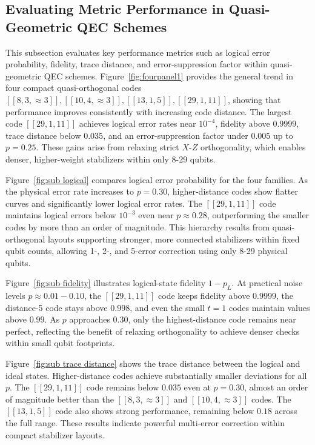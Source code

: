 \documentclass{iopjournal}
\theoremstyle{thmstyleone}%
\theoremstyle{thmstyletwo}%
\theoremstyle{thmstylethree}%
\begin{document}
\subsection{Evaluating Metric Performance in Quasi-Geometric QEC Schemes}


This subsection evaluates key performance metrics such as logical error probability, fidelity, trace distance, and error-suppression factor within quasi-geometric QEC schemes. Figure~\ref{fig:fourpanel1} provides the general trend in four compact quasi-orthogonal codes 
\([[8,3,\approx 3]], [[10,4,\approx 3]], [[13,1,5]], [[29,1,11]]\), showing that performance improves consistently with increasing code distance. The largest code \([[29,1,11]]\) achieves logical error rates near \(10^{-4}\), fidelity above \(0.9999\), trace distance below \(0.035\), and an error-suppression factor under \(0.005\) 
up to \(p=0.25\). These gains arise from relaxing strict \(X\)-\(Z\) orthogonality, which enables denser, higher-weight stabilizers within only 8-29 qubits.

Figure~\ref{fig:sub logical} compares logical error probability for the four families. As the physical error rate increases to \(p=0.30\), higher-distance codes show flatter curves and significantly lower logical error rates. The \([[29,1,11]]\) code maintains logical errors below \(10^{-3}\) even near 
\(p \approx 0.28\), outperforming the smaller codes by more than an order of magnitude. This hierarchy results from quasi-orthogonal layouts supporting stronger, more connected stabilizers within fixed qubit counts, allowing 1-, 2-, and 5-error correction using only 8-29 physical qubits.

Figure~\ref{fig:sub fidelity} illustrates logical-state fidelity \(1 - p_L\). At practical noise levels \(p \approx 0.01{-}0.10\), the \([[29,1,11]]\) code keeps fidelity above \(0.9999\), the distance-5 code stays above \(0.998\), and even the small \(t=1\) codes maintain values above \(0.99\). As \(p\) approaches 0.30, only the highest-distance code remains near perfect, reflecting the benefit of relaxing orthogonality to achieve denser checks within small qubit footprints.

Figure~\ref{fig:sub trace distance} shows the trace distance between the logical and ideal states. Higher-distance codes achieve substantially smaller deviations for all \(p\). The \([[29,1,11]]\) code remains below \(0.035\) even at \(p=0.30\), almost an order of magnitude better than the \([[8,3,\approx 3]]\) and \([[10,4,\approx3]]\) codes. The \([[13,1,5]]\) code also shows strong performance, remaining below \(0.18\) across the full range. These results indicate powerful multi-error correction within 
compact stabilizer layouts.
\end{document}
